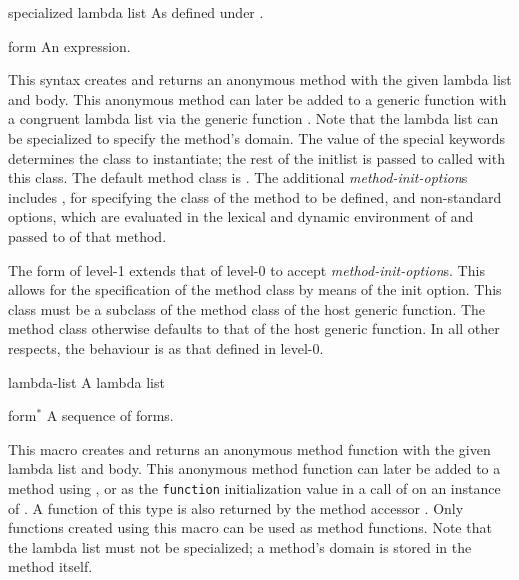 \begin{optDefinition}
\begin{arguments}
    \item[specialized lambda list] As defined under .

    \item[form] An expression.
\end{arguments}
%
\result%
This syntax creates and returns an anonymous method with the given
lambda list and body.  This anonymous method can later be added to a generic
function with a congruent lambda list via the generic function
.  Note that the lambda list can be specialized to
specify the method's domain.  The value of the special keywords 
determines the class to instantiate; the rest of the initlist is passed to
 called with this class.  The default method class is
.
%
\remarks%
The additional {\em method-init-option\/}s includes , for
specifying the class of the method to be defined, and non-standard
options, which are evaluated in the lexical and dynamic environment of
 and passed to  of that method.

\Syntax
{}%
%
%
\remarks%
The  form of level-1 extends that of level-0 to accept
{\em method-init-option\/}s.  This allows for the specification of the
method class by means of the  init option.  This class must
be a subclass of the method class of the host generic function. The
method class otherwise defaults to that of the host generic function.
In all other respects, the behaviour is as that defined in level-0.

%
\begin{arguments}
    \item[lambda-list] A lambda list
    \item[form$^*$] A sequence of forms.
\end{arguments}
%
This macro creates and returns an anonymous method function with the given
lambda list and body. This anonymous method function can later be added to a
method using , or as the {\tt function}
initialization value in a call of  on an instance of
.  A function of this type is also returned by the method
accessor .  Only functions created using this macro
can be used as method functions.  Note that the lambda list must not be
specialized; a method's domain is stored in the method itself.


\end{optDefinition}
